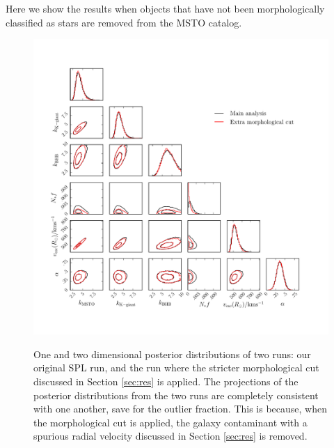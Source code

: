 \documentclass[useAMS,twocolumn,usenatbib]{mn2e}
\begin{document}
Here we show the results when objects that have not been morphologically classified as stars are removed from the MSTO catalog.

\begin{figure}
\includegraphics[width=2\columnwidth]{plots/morphological_comparison_corner}\\
\caption{One and two dimensional posterior distributions of two runs: our original SPL run, and the run where the stricter morphological cut discussed in Section \ref{sec:res} is applied.
The projections of the posterior distributions from the two runs are completely consistent with one another, save for the outlier fraction.
This is because, when the morphological cut is applied, the galaxy contaminant with a spurious radial velocity discussed in Section \ref{sec:res} is removed.}
\label{fig:morph_corner}
\end{figure}

\label{sec:morph}
\end{document}
